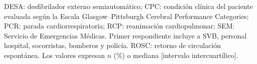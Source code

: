 \begin{table}[ht]
\begin{flushleft}
\scriptsize
DESA: desfibrilador externo semiautomático;
CPC: condición clínica del paciente evaluada según la Escala Glasgow–Pittsburgh Cerebral Performance Categories;
PCR: parada cardiorrespiratoria; RCP: reanimación cardiopulmonar;
SEM: Servicio de Emergencias Médicas. Primer respondiente incluye a SVB, personal hospital, socorristas, bomberos y policía.
ROSC: retorno de circulación espontánea. Los valores expresan $n$ (\%) o mediana [intervalo intercuartílico].

\end{flushleft}
\label{tab:descriptive_statistics}
\end{table}